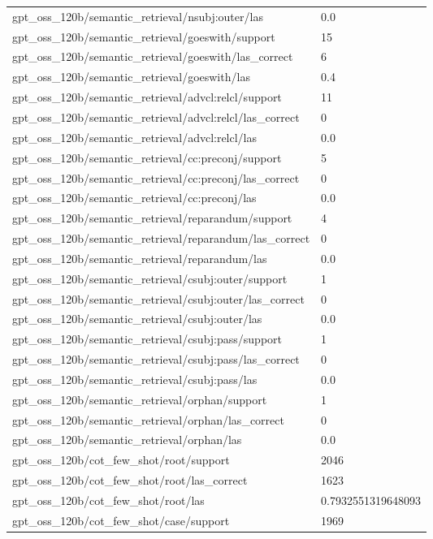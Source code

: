 \begin{tabular}{ll}
gpt\_oss\_120b/semantic\_retrieval/nsubj:outer/las & 0.0 \\
gpt\_oss\_120b/semantic\_retrieval/goeswith/support & 15 \\
gpt\_oss\_120b/semantic\_retrieval/goeswith/las\_correct & 6 \\
gpt\_oss\_120b/semantic\_retrieval/goeswith/las & 0.4 \\
gpt\_oss\_120b/semantic\_retrieval/advcl:relcl/support & 11 \\
gpt\_oss\_120b/semantic\_retrieval/advcl:relcl/las\_correct & 0 \\
gpt\_oss\_120b/semantic\_retrieval/advcl:relcl/las & 0.0 \\
gpt\_oss\_120b/semantic\_retrieval/cc:preconj/support & 5 \\
gpt\_oss\_120b/semantic\_retrieval/cc:preconj/las\_correct & 0 \\
gpt\_oss\_120b/semantic\_retrieval/cc:preconj/las & 0.0 \\
gpt\_oss\_120b/semantic\_retrieval/reparandum/support & 4 \\
gpt\_oss\_120b/semantic\_retrieval/reparandum/las\_correct & 0 \\
gpt\_oss\_120b/semantic\_retrieval/reparandum/las & 0.0 \\
gpt\_oss\_120b/semantic\_retrieval/csubj:outer/support & 1 \\
gpt\_oss\_120b/semantic\_retrieval/csubj:outer/las\_correct & 0 \\
gpt\_oss\_120b/semantic\_retrieval/csubj:outer/las & 0.0 \\
gpt\_oss\_120b/semantic\_retrieval/csubj:pass/support & 1 \\
gpt\_oss\_120b/semantic\_retrieval/csubj:pass/las\_correct & 0 \\
gpt\_oss\_120b/semantic\_retrieval/csubj:pass/las & 0.0 \\
gpt\_oss\_120b/semantic\_retrieval/orphan/support & 1 \\
gpt\_oss\_120b/semantic\_retrieval/orphan/las\_correct & 0 \\
gpt\_oss\_120b/semantic\_retrieval/orphan/las & 0.0 \\
gpt\_oss\_120b/cot\_few\_shot/root/support & 2046 \\
gpt\_oss\_120b/cot\_few\_shot/root/las\_correct & 1623 \\
gpt\_oss\_120b/cot\_few\_shot/root/las & 0.7932551319648093 \\
gpt\_oss\_120b/cot\_few\_shot/case/support & 1969 \\

\end{tabular}
